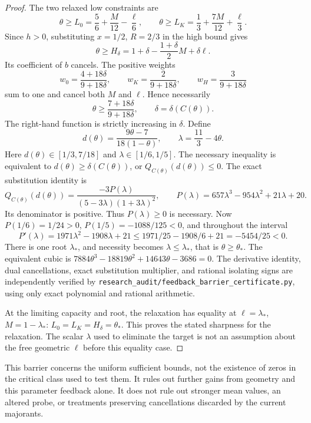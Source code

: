 \documentclass[11pt]{article}
\begin{document}
\begin{proof}
The two relaxed low constraints are
\[
 \theta\ge L_0=\frac56+\frac M{12}-\frac\ell6,
 \qquad
 \theta\ge L_K=\frac13+\frac{7M}{12}+\frac\ell3.
\]
Since $h>0$, substituting $x=1/2$, $R=2/3$ in the high bound gives
\[
 \theta\ge H_\delta=1+\delta-\frac{1+\delta}{2}M+\delta\ell.
\]
Its coefficient of $b$ cancels. The positive weights
\[
 w_0=\frac{4+18\delta}{9+18\delta},\qquad
 w_K=\frac2{9+18\delta},\qquad
 w_H=\frac3{9+18\delta}
\]
sum to one and cancel both $M$ and $\ell$. Hence necessarily
\[
 \theta\ge\frac{7+18\delta}{9+18\delta},
 \qquad\delta=\delta(C(\theta)).
\]
The right-hand function is strictly increasing in $\delta$. Define
\[
 d(\theta)=\frac{9\theta-7}{18(1-\theta)},\qquad
 \lambda=\frac{11}{3}-4\theta.
\]
Here $d(\theta)\in[1/3,7/18]$ and $\lambda\in[1/6,1/5]$.
The necessary inequality is equivalent to
$d(\theta)\ge\delta(C(\theta))$, or
$Q_{C(\theta)}(d(\theta))\le0$. The exact substitution identity is
\[
 Q_{C(\theta)}(d(\theta))
 =\frac{-3P(\lambda)}{(5-3\lambda)(1+3\lambda)^2},\qquad
 P(\lambda)=657\lambda^3-954\lambda^2+21\lambda+20.
\]
Its denominator is positive. Thus $P(\lambda)\ge0$ is necessary.
Now $P(1/6)=1/24>0$, $P(1/5)=-1088/125<0$, and throughout the interval
\[
 P'(\lambda)=1971\lambda^2-1908\lambda+21
 \le1971/25-1908/6+21=-5454/25<0.
\]
There is one root $\lambda_*$, and necessity becomes
$\lambda\le\lambda_*$, that is $\theta\ge\theta_*$.
The equivalent cubic is
$7884\theta^3-18819\theta^2+14643\theta-3686=0$.
The derivative identity, dual cancellations, exact substitution multiplier,
and rational isolating signs are independently verified by
\texttt{research\_audit/feedback\_barrier\_certificate.py}, using only
exact polynomial and rational arithmetic.

At the limiting capacity and root, the relaxation has equality at
$\ell=\lambda_*$, $M=1-\lambda_*$:
$L_0=L_K=H_\delta=\theta_*$. This proves the stated sharpness for
the relaxation. The scalar $\lambda$ used to eliminate the target is not
an assumption about the free geometric $\ell$ before this equality case.
\end{proof}

This barrier concerns the uniform sufficient bounds, not the existence
of zeros in the critical class used to test them. It rules out further
gains from geometry and this parameter feedback alone. It does not rule
out stronger mean values, an altered probe, or treatments preserving
cancellations discarded by the current majorants.
\end{document}
